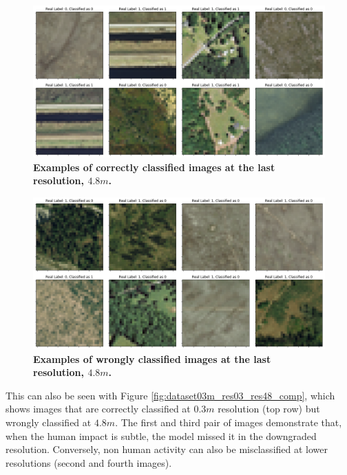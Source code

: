\begin{figure}[H]
	\centering
	\captionsetup{width=1\linewidth}
	\includegraphics[width=1\textwidth]{Figures/results/class_dataset03m_res48_correct.png}
	\caption{\textbf{Examples of correctly classified images at the last resolution, $4.8m$.}}
	\label{fig:dataset03m_res48_correct}
\end{figure}

\begin{figure}[H]
	\centering
	\captionsetup{width=1\linewidth}
	\includegraphics[width=1\textwidth]{Figures/results/class_dataset03m_res48_wrong.png}
	\caption{\textbf{Examples of wrongly classified images at the last resolution, $4.8m$.}}
	\label{fig:dataset03m_res48_wrong}
\end{figure}

This can also be seen with Figure \ref{fig:dataset03m_res03_res48_comp}, which shows images that are correctly classified at $0.3m$ resolution (top row) but wrongly classified at $4.8m$. The first and third pair of images demonstrate that, when the human impact is subtle, the model missed it in the downgraded resolution. Conversely, non human activity can also be misclassified at lower resolutions (second and fourth images).

